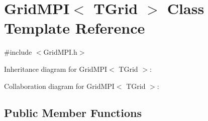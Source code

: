 \hypertarget{class_grid_m_p_i}{}\section{Grid\+M\+P\+I$<$ T\+Grid $>$ Class Template Reference}
\label{class_grid_m_p_i}


{\ttfamily \#include $<$Grid\+M\+P\+I.\+h$>$}



Inheritance diagram for Grid\+M\+P\+I$<$ T\+Grid $>$\+:


Collaboration diagram for Grid\+M\+P\+I$<$ T\+Grid $>$\+:
\subsection*{Public Member Functions}
